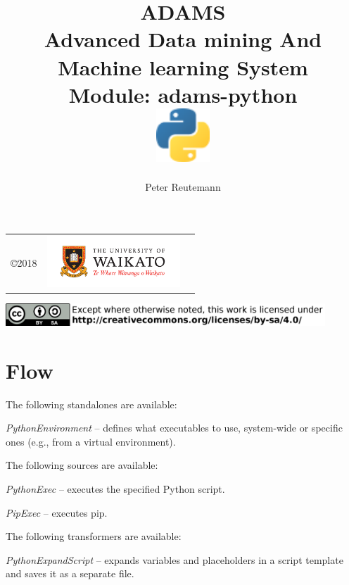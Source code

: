 \documentclass[a4paper]{book}
\title{
  \textbf{ADAMS} \\
  {\Large \textbf{A}dvanced \textbf{D}ata mining \textbf{A}nd \textbf{M}achine
  learning \textbf{S}ystem} \\
  {\Large Module: adams-python} \\
  \vspace{1cm}
  \includegraphics[width=2cm]{images/python-module.png} \\
}
\author{
  Peter Reutemann
}
\begin{document}
\begin{titlepage}
\maketitle

\thispagestyle{empty}
\center
\begin{table}[b]
	\begin{tabular}{c l l}
		\parbox[c][2cm]{2cm}{\copyright 2018} &
		\parbox[c][2cm]{5cm}{\includegraphics[width=5cm]{images/coat_of_arms.pdf}}
	\end{tabular}
	\includegraphics[width=12cm]{images/cc.png} \\
\end{table}

\end{titlepage}

\tableofcontents

\chapter{Flow}

The following standalones are available:
\begin{tight_itemize}
  \item \textit{PythonEnvironment} -- defines what executables to use, system-wide
  or specific ones (e.g., from a virtual environment).
\end{tight_itemize}

The following sources are available:
\begin{tight_itemize}
  \item \textit{PythonExec} -- executes the specified Python script.
  \item \textit{PipExec} -- executes pip.
\end{tight_itemize}

The following transformers are available:
\begin{tight_itemize}
  \item \textit{PythonExpandScript} -- expands variables and placeholders in a
  script template and saves it as a separate file.
\end{tight_itemize}



\end{document}
